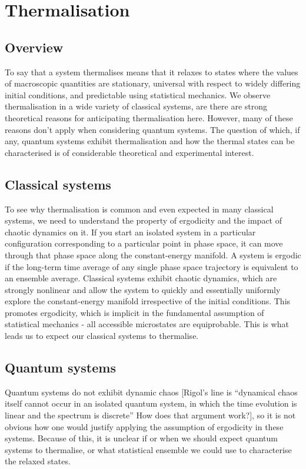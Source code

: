 \documentclass[a4paper,10pt]{article}
\begin{document}
\section{Thermalisation}
 \subsection{Overview}
 
To say that a system thermalises means that it relaxes to states where the values of macroscopic quantities are stationary, universal with respect to 
widely differing initial conditions, and predictable using statistical mechanics\cite{Rigol2008}. We observe thermalisation in a wide variety of classical systems, are there 
are strong theoretical reasons for anticipating thermalisation here. However, many of these reasons don't apply when considering quantum systems. The question of 
which, if any, quantum systems exhibit thermalisation and how the thermal states can be characterised is of considerable theoretical and experimental interest. 

 \subsection{Classical systems}
To see why thermalisation is common and even expected in many classical systems, we need to understand the property of ergodicity and the impact of chaotic dynamics on it. 
If you start an isolated system in a particular configuration corresponding to a particular point in phase space, it can move through that phase space along the constant-energy
manifold. A system is ergodic if the long-term time average of any single phase space trajectory is equivalent to an ensemble average.  
Classical systems  exhibit chaotic dynamics, which are strongly nonlinear and allow the system to quickly 
and essentially uniformly explore the constant-energy manifold irrespective of the initial conditions. This promotes ergodicity, which is implicit in the fundamental assumption of 
statistical mechanics - all accessible microstates are equiprobable.  This is what leads us to expect our classical systems to thermalise.

 \subsection{Quantum systems}
Quantum systems do not  exhibit dynamic chaos  [Rigol's line is ``dynamical chaos itself cannot occur in an isolated quantum system, in which the time 
evolution is linear and the spectrum is discrete'' How does that argument work?], so it is not obvious how one would justify applying the assumption of ergodicity in these systems. Because of 
this, it is unclear if or when we should expect quantum systems to thermalise, or what statistical ensemble we could use to characterise the relaxed states. 
\end{document}

